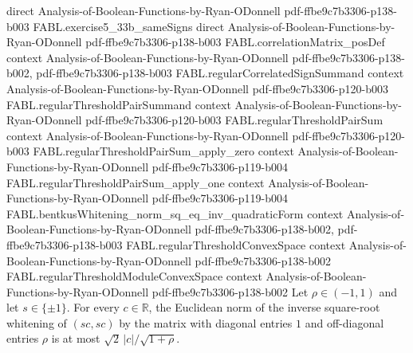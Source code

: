 \begin{theorem}
  {direct}
  {Analysis-of-Boolean-Functions-by-Ryan-ODonnell}
  {pdf-ffbe9c7b3306-p138-b003}
\proofstep
  {FABL.exercise5_33b_sameSigns}
  {direct}
  {Analysis-of-Boolean-Functions-by-Ryan-ODonnell}
  {pdf-ffbe9c7b3306-p138-b003}
\proofstep
  {FABL.correlationMatrix_posDef}
  {context}
  {Analysis-of-Boolean-Functions-by-Ryan-ODonnell}
  {pdf-ffbe9c7b3306-p138-b002,
    pdf-ffbe9c7b3306-p138-b003}
\proofstep
  {FABL.regularCorrelatedSignSummand}
  {context}
  {Analysis-of-Boolean-Functions-by-Ryan-ODonnell}
  {pdf-ffbe9c7b3306-p120-b003}
\proofstep
  {FABL.regularThresholdPairSummand}
  {context}
  {Analysis-of-Boolean-Functions-by-Ryan-ODonnell}
  {pdf-ffbe9c7b3306-p120-b003}
\proofstep
  {FABL.regularThresholdPairSum}
  {context}
  {Analysis-of-Boolean-Functions-by-Ryan-ODonnell}
  {pdf-ffbe9c7b3306-p120-b003}
\proofstep
  {FABL.regularThresholdPairSum_apply_zero}
  {context}
  {Analysis-of-Boolean-Functions-by-Ryan-ODonnell}
  {pdf-ffbe9c7b3306-p119-b004}
\proofstep
  {FABL.regularThresholdPairSum_apply_one}
  {context}
  {Analysis-of-Boolean-Functions-by-Ryan-ODonnell}
  {pdf-ffbe9c7b3306-p119-b004}
\proofstep
  {FABL.bentkusWhitening_norm_sq_eq_inv_quadraticForm}
  {context}
  {Analysis-of-Boolean-Functions-by-Ryan-ODonnell}
  {pdf-ffbe9c7b3306-p138-b002,
    pdf-ffbe9c7b3306-p138-b003}
\proofstep
  {FABL.regularThresholdConvexSpace}
  {context}
  {Analysis-of-Boolean-Functions-by-Ryan-ODonnell}
  {pdf-ffbe9c7b3306-p138-b002}
\proofstep
  {FABL.regularThresholdModuleConvexSpace}
  {context}
  {Analysis-of-Boolean-Functions-by-Ryan-ODonnell}
  {pdf-ffbe9c7b3306-p138-b002}
Let $\rho\in(-1,1)$ and let $s\in\{\pm1\}$. For every $c\in\mathbb R$, the Euclidean
norm of the inverse square-root whitening of $(sc,sc)$ by the matrix with diagonal
entries $1$ and off-diagonal entries $\rho$ is at most $\sqrt{2}\,|c|/\sqrt{1+\rho}$.
\end{theorem}

